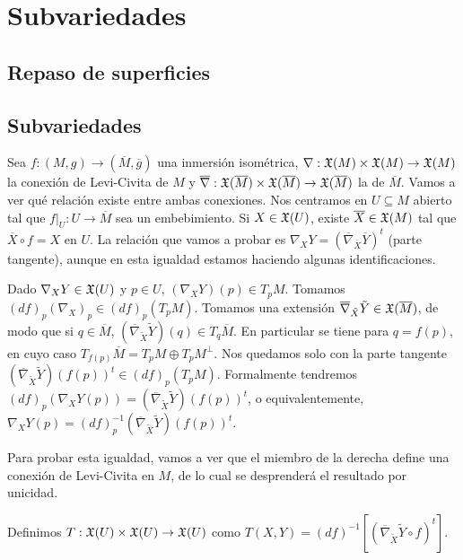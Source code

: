 \documentclass[GSR.tex]{subfiles}
\begin{document}

\chapter{Subvariedades}

 
\section{Repaso de superficies}

\section{Subvariedades }
Sea $f:(M,g)\to(\overline{M},\overline{g})$ una inmersión isométrica, $\nabla:{\mathfrak{X}}(M)\times{\mathfrak{X}}(M)\to{\mathfrak{X}}(M)$ la conexión de Levi-Civita de $M$ y $\overline{\nabla}:{\mathfrak{X}}(\overline{M})\times{\mathfrak{X}}(\overline{M})\to{\mathfrak{X}}(\overline{M})$ la de $\overline{M}$. Vamos a ver qué relación existe entre ambas conexiones. Nos centramos en $U\subseteq M$ abierto tal que $f|_U:U\to\overline{M}$ sea un embebimiento. Si $X\in{\mathfrak{X}}(U)$, existe $\overline{X}\in{\mathfrak{X}}(M)$ tal que $\overline{X}\circ f=X$ en $U$. La relación que vamos a probar es $\nabla_X Y=(\overline{\nabla}_{\overline{X}}\overline{Y})^t$ (parte tangente), aunque en esta igualdad estamos haciendo algunas identificaciones.

Dado $\nabla_XY\in{\mathfrak{X}}(U)$ y $p\in U$, $(\nabla_X Y)(p)\in T_pM$. Tomamos $(df)_p(\nabla_X)_p\in (df)_p(T_pM)$. Tomamos una extensión $\overline{\nabla}_{\tilde{X}}\tilde{Y}\in{\mathfrak{X}}(\overline{M})$, de modo que si $q\in \overline{M}$, $(\overline{\nabla}_{\tilde{X}}\tilde{Y})(q)\in T_q\overline{M}$. En particular se tiene para $q=f(p)$, en cuyo caso $T_{f(p)}\overline{M}=T_pM\oplus T_pM^\perp$. Nos quedamos solo con la parte tangente $(\overline{\nabla}_{\tilde{X}}\tilde{Y})(f(p))^t\in(df)_p(T_pM)$. Formalmente tendremos $(df)_p(\nabla_XY(p))=(\overline{\nabla}_{\tilde{X}}\tilde{Y})(f(p))^t$, o equivalentemente, 
$\nabla_XY(p)=(df)^{-1}_p(\overline{\nabla}_{\tilde{X}}\tilde{Y})(f(p))^t$.

Para probar esta igualdad, vamos a ver que el miembro de la derecha define una conexión de Levi-Civita en $M$, de lo cual se desprenderá el resultado por unicidad. 

Definimos $T:{\mathfrak{X}}(U)\times{\mathfrak{X}}(U)\to{\mathfrak{X}}(U)$ como $T(X,Y)=(df)^{-1}[(\overline{\nabla}_{\tilde{X}}\tilde{Y}\circ f)^t]$.
\end{document}
